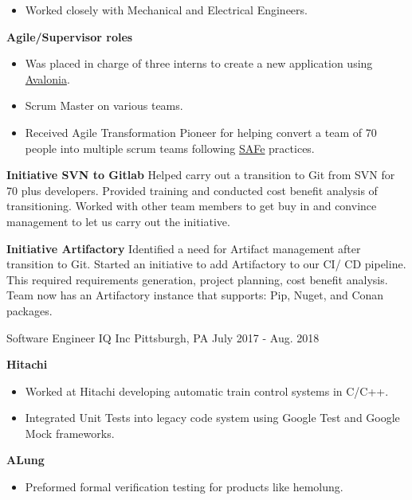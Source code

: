 \begin{cventries}
{\begin{cvitems}
{\begin{itemize}
        \item Worked closely with Mechanical and Electrical Engineers. 
    \end{itemize} 
}
\item 
{
    \textbf{Agile/Supervisor roles} 
    \begin{itemize}
        \item Was placed in charge of three interns to create a new application using \href{https://avaloniaui.net/}{\color{RoyalBlue}Avalonia}.
        \item Scrum Master on various teams. 
        \item Received Agile Transformation Pioneer for helping convert a team of 70 people into multiple scrum teams following \href{https://www.scaledagileframework.com/}{SAFe} practices.
    \end{itemize} 
}
\item 
{
    \textbf{Initiative SVN to Gitlab} Helped carry out a transition to Git from SVN for 70 plus developers. Provided training and conducted cost benefit analysis 
    of transitioning. Worked with other team members to get buy in and convince management to let us carry out the initiative.
}
\item 
{
    \textbf{Initiative Artifactory} Identified a need for Artifact management after transition to Git. Started an initiative to add Artifactory to our CI/ CD pipeline. 
    This required requirements generation, project planning, cost benefit analysis. Team now has an Artifactory instance that supports: Pip, Nuget, and Conan packages.
}
\end{cvitems}
}



\cventry
{Software Engineer} %
{IQ Inc} %
{Pittsburgh, PA } %
{July 2017 - Aug. 2018} %
{ %
\begin{cvitems}
\item 
{
    \textbf{Hitachi}
    \begin{itemize}
        \item Worked at Hitachi developing automatic train control systems in C/C++.
        \item Integrated Unit Tests into legacy code system using Google Test and Google Mock frameworks.
    \end{itemize} 
}
\item 
{
    \textbf{ALung}
    \begin{itemize}
        \item Preformed formal verification testing for products like hemolung. 
    \end{itemize} 
}  
\end{cvitems}
}




\end{cventries}
